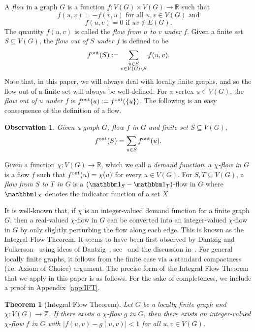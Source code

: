\documentclass[12pt,a4paper]{amsart}
\numberwithin{equation}{section}
\newtheorem{theorem}[equation]{Theorem}
\newtheorem{obs}[equation]{Observation}
\theoremstyle{definition}
\begin{document}
A \emph{flow} in a graph $G$ is a function $f:V(G)\times V(G)\to \mathbb{R}$ such that
\[f(u,v)=-f(v,u)\text{ for all }u,v\in V(G) \text{ and}\]
\[f(u,v)=0\text{ if }uv\notin E(G).\]
The quantity $f(u,v)$ is called the \emph{flow from $u$ to $v$ under $f$}. Given a finite set $S\subseteq V(G)$, the \emph{flow out of $S$ under $f$} is defined to be
\[f^{\operatorname{out}}(S):= \sum_{\substack{u\in S\\ v\in V(G)\setminus S}}f(u,v).\]
Note that, in this paper, we will always deal with locally finite graphs, and so the flow out of a finite set will always be well-defined. For a vertex $u\in V(G)$, the \emph{flow out of $u$ under $f$} is $f^{\operatorname{out}}(u):=f^{\operatorname{out}}(\{u\})$. The following is an easy consequence of the definition of a flow.
\begin{obs}
\label{obs:flowOutOfS}
Given a graph $G$, flow $f$ in $G$ and finite set $S\subseteq V(G)$,
\[f^{\operatorname{out}}(S) = \sum_{u\in S}f^{\operatorname{out}}(u).\]
\end{obs}

 Given a function $\chi:V(G)\to \mathbb{R}$, which we call a \emph{demand function}, a \emph{$\chi$-flow in $G$} is a flow $f$ such that $f^{\operatorname{out}}(u)=\chi(u)$ for every $u\in V(G)$. For $S,T\subseteq V(G)$, a \emph{flow from $S$ to $T$ in $G$} is a $\left(\ind_S-\ind_T\right)$-flow in $G$ where $\ind_X$ denotes the indicator function of a set $X$. 


It is well-known that, if $\chi$ is an integer-valued demand function for a finite graph $G$, then a real-valued $\chi$-flow in $G$ can be converted into an integer-valued $\chi$-flow in $G$ by only slightly perturbing the flow along each edge. This is known as the Integral Flow Theorem. It seems to have been first observed by Dantzig and Fulkerson~\cite{DantzigFulkerson56} using ideas of Dantzig~\cite{Dantzig51}; see~\cite[Corollary~10.3a]{Schrijver03} and the discussion in~\cite[p.~64]{Schrijver03}. For general locally finite graphs, it follows from the finite case via a standard compactness (i.e. Axiom of Choice) argument. The precise form of the Integral Flow Theorem that we apply in this paper is as follows. For the sake of completeness, we include a proof  in Appendix~\ref{app:IFT}.

\begin{theorem}[Integral Flow Theorem]
\label{th:IFT}
Let $G$ be a locally finite graph and $\chi:V(G)\to \mathbb{Z}$. If there exists a $\chi$-flow $g$ in $G$, then there exists an integer-valued $\chi$-flow $f$ in $G$ with $|f(u,v)-g(u,v)|<1$ for all $u,v\in V(G)$.
\end{theorem}
\end{document}
